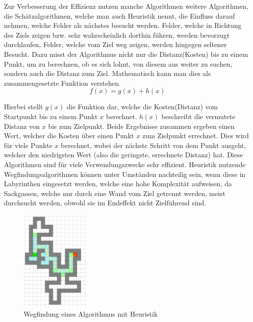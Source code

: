 {{		Zur Verbesserung der Effizienz nutzen manche Algorithmen weitere Algorithmen, die Schätzalgorithmen, welche man auch Heuristik nennt, die Einfluss darauf nehmen, welche Felder als nächstes besucht werden. Felder, welche in Richtung des Ziels zeigen bzw. sehr wahrscheinlich dorthin führen, werden bevorzugt durchlaufen, Felder, welche vom Ziel weg zeigen, werden hingegen seltener Besucht. Dazu misst der Algorithmus nicht nur die Distanz(Kosten) bis zu einem Punkt, um zu berechnen, ob es sich lohnt, von diesem aus weiter zu suchen, sondern auch die Distanz zum Ziel. Mathematisch kann man dies als zusammengesetzte Funktion verstehen.
		\begin{equation}
			f(x) = g(x) + h(x)
		\end{equation}
		
		Hierbei stellt $g(x)$ die Funktion dar, welche die Kosten(Distanz) vom Startpunkt bis zu einem Punkt $x$ berechnet. $h(x)$ beschreibt die vermutete Distanz von $x$ bis zum Zielpunkt. Beide Ergebnisse zusammen ergeben einen Wert, welcher die Kosten über einen Punkt $x$ zum Zielpunkt errechnet. Dies wird für viele Punkte $x$ berechnet, wobei der nächste Schritt von dem Punkt ausgeht, welcher den niedrigsten Wert (also die geringste, errechnete Distanz) hat.
		Diese Algorithmen sind für viele Verwendungszwecke sehr effizient. Heuristik nutzende Wegfindungsalgorithmen können unter Umständen nachteilig sein, wenn diese in Labyrinthen eingesetzt werden, welche eine hohe Komplexität aufweisen, da Sackgassen, welche nur durch eine Wand vom Ziel getrennt werden, meist durchsucht werden, obwohl sie im Endeffekt nicht Zielführend sind.
		
		\begin{figure}[H]
			\centering
			\includegraphics[height=5cm]{Bilder/pathfinding_laby_heu.png}
			\caption{Wegfindung eines Algorithmus mit Heuristik} 
			\label{pic:pathlabheu}
		\end{figure}
		
}}
